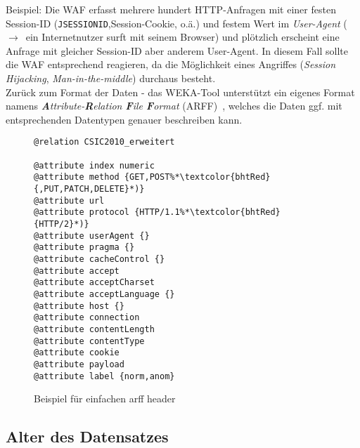 \textcolor{bhtGray}{ Beispiel:} Die WAF erfasst mehrere hundert HTTP-Anfragen mit einer festen Session-ID (\verb=JSESSIONID=,Session-Cookie, o.ä.) und festem Wert im \emph{User-Agent} (~$\rightarrow$~ein Internetnutzer surft mit seinem Browser) und plötzlich erscheint eine Anfrage mit gleicher Session-ID aber anderem User-Agent. In diesem Fall sollte die WAF entsprechend reagieren, da die Möglichkeit eines Angriffes (\emph{Session Hijacking}, \emph{Man-in-the-middle}) durchaus besteht.\\
  
Zurück zum Format der Daten - das WEKA-Tool unterstützt ein eigenes Format namens \emph{\textbf{A}ttribute-\textbf{R}elation \textbf{F}ile \textbf{F}ormat} (ARFF)~\cite{arff2023}, welches die Daten ggf. mit entsprechenden Datentypen genauer beschreiben kann.

\begin{figure}[h]
  \caption{Beispiel für einfachen arff header}
  \label{fig:csicarff}
  \begin{lstlisting}
@relation CSIC2010_erweitert

@attribute index numeric
@attribute method {GET,POST%*\textcolor{bhtRed}{,PUT,PATCH,DELETE}*)}
@attribute url
@attribute protocol {HTTP/1.1%*\textcolor{bhtRed}{HTTP/2}*)}
@attribute userAgent {}
@attribute pragma {}
@attribute cacheControl {}
@attribute accept
@attribute acceptCharset
@attribute acceptLanguage {}
@attribute host {}
@attribute connection
@attribute contentLength
@attribute contentType
@attribute cookie
@attribute payload
@attribute label {norm,anom}
\end{lstlisting}
\end{figure}

\subsection{Alter des Datensatzes}


